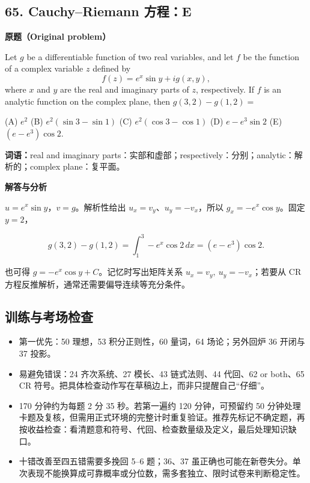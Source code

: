 \documentclass[11pt,a4paper,fontset=fandol]{ctexart}
\providecommand{\tightlist}{\setlength{\itemsep}{0pt}\setlength{\parskip}{0pt}}
\begin{document}
\hypertarget{cauchyriemann-ux65b9ux7a0be}{%
\subsection{65. Cauchy--Riemann
方程：E}\label{cauchyriemann-ux65b9ux7a0be}}

\textbf{原题（Original problem）}\par
Let $g$ be a differentiable function of two real variables, and let $f$ be the function of a complex variable $z$ defined by
\[f(z)=e^x\sin y+ig(x,y),\]
where $x$ and $y$ are the real and imaginary parts of $z$, respectively. If $f$ is an analytic function on the complex plane, then $g(3,2)-g(1,2)=$

(A) $e^2$ \quad (B) $e^2(\sin3-\sin1)$ \quad (C) $e^2(\cos3-\cos1)$ \quad (D) $e-e^3\sin2$ \quad (E) $(e-e^3)\cos2$.

\textbf{词语：}real and imaginary parts：实部和虚部；respectively：分别；analytic：解析的；complex plane：复平面。

\textbf{解答与分析}\par


\(u=e^x\sin y\)，\(v=g\)。解析性给出 \(u_x=v_y\)、\(u_y=-v_x\)，所以
\(g_x=-e^x\cos y\)。固定 \(y=2\)，

\[g(3,2)-g(1,2)=\int_1^3-e^x\cos2\,dx=(e-e^3)\cos2.\]

也可得 \(g=-e^x\cos y+C\)。记忆时写出矩阵关系
\(u_x=v_y,\ u_y=-v_x\)；若要从 CR
方程反推解析，通常还需要偏导连续等充分条件。

\hypertarget{ux8badux7ec3ux4e0eux8003ux573aux68c0ux67e5}{%
\subsection{训练与考场检查}\label{ux8badux7ec3ux4e0eux8003ux573aux68c0ux67e5}}

\begin{itemize}
\tightlist
\item
  第一优先：50 理想，53 积分正则性，60 量词，64 场论；另外回炉 36 开闭与
  37 投影。
\item
  易避免错误：24 齐次系统、27 模长、43 链式法则、44 代回、62 or both、65
  CR 符号。把具体检查动作写在草稿边上，而非只提醒自己``仔细''。
\item
  170 分钟约为每题 2 分 35 秒。若第一遍约 120 分钟，可预留约 50
  分钟处理卡题及复核，但需用正式环境的完整计时重复验证。推荐先标记不确定题，再按收益检查：看清题意和符号、代回、检查数量级及定义，最后处理知识缺口。
\item
  十错改善至四五错需要多挽回 5--6 题；36、37
  虽正确也可能在新卷失分。单次表现不能换算成可靠概率或分位数，需多套独立、限时试卷来判断稳定性。
\end{itemize}
\end{document}
